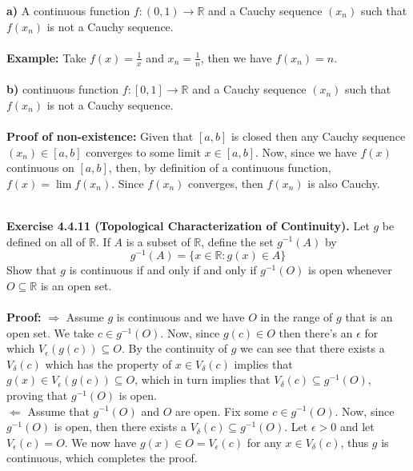 \documentclass{article}
\begin{document}
	\begin{itemize}
		\textbf{a)} A continuous function $f : (0, 1) \to \mathbb{R}$ and a Cauchy sequence $(x_n)$ such that $f(x_n)$ is not a Cauchy sequence. \\ \\
		\textbf{Example:} Take $f(x) = \frac{1}{x}$ and $x_n = \frac{1}{n}$, then we have $f(x_n) = n$. \\ \\
		\textbf{b)} \A continuous function $f : [0, 1] \to \mathbb{R}$ and a Cauchy sequence $(x_n)$ such that $f(x_n)$ is not a Cauchy sequence. \\ \\
		\textbf{Proof of non-existence:} Given that $[a, b]$ is closed then any Cauchy sequence $(x_n) \in [a, b]$ converges to some limit $x \in [a, b]$. Now, since we have $f(x)$ continuous on $[a, b]$, then, by definition of a continuous function, $f(x) = \lim f(x_n)$. Since $f(x_n)$ converges, then $f(x_n)$ is also Cauchy. \\ \\
	\end{itemize}
	\textbf{Exercise 4.4.11 (Topological Characterization of Continuity).} Let $g$ be defined on all of $\mathbb{R}$. If $A$ is a subset of $\mathbb{R}$, define the set $g^{-1}(A)$ by
		$$g^{-1}(A) = \{x \in \mathbb{R} : g(x) \in A\}$$
	Show that $g$ is continuous if and only if and only if $g^{-1}(O)$ is open whenever $O \subseteq \mathbb{R}$ is an open set. \\ \\
	\textbf{Proof:} $\Longrightarrow$ Assume $g$ is continuous and we have $O$ in the range of $g$ that is an open set. We take $c \in g^{-1}(O)$. Now, since $g(c) \in O$ then there's an $\epsilon$ for which $V_\epsilon(g(c)) \subseteq O$. By the continuity of $g$ we can see that there exists a $V_\delta(c)$ which has the property of $x \in V_\delta(c)$ implies that $g(x) \in V_\epsilon(g(c)) \subseteq O$, which in turn implies that $V_\delta(c) \subseteq g^{-1}(O)$, proving that $g^{-1}(O)$ is open. \\
	$\Longleftarrow$ Assume that $g^{-1}(O)$ and $O$ are open. Fix some $c \in g^{-1}(O)$. Now, since $g^{-1}(O)$ is open, then there exists a $V_\delta(c) \subseteq g^{-1}(O)$. Let $\epsilon > 0$ and let $V_\epsilon(c) = O$. We now have $g(x) \in O = V_\epsilon(c)$ for any $x \in V_\delta(c)$, thus $g$ is continuous, which completes the proof.
\end{document}
